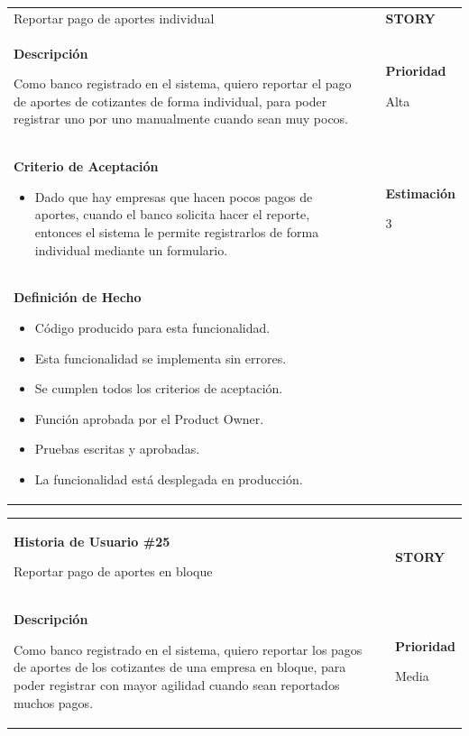 \documentclass[12pt,a4paper]{article}
\begin{document}
\begin{center}
\begin{tabular}{| p{10cm} c p{2.5cm}|}
Reportar pago de aportes individual & & \textbf{{\Large STORY}} \\ 
\textbf{Descripción}

Como banco registrado en el sistema, quiero reportar el pago de aportes
de cotizantes de forma individual, para poder registrar uno por uno
manualmente cuando sean muy pocos. &  & \textbf{Prioridad}

Alta\\

\textbf{Criterio de Aceptación}

\begin{itemize}
\item Dado que hay empresas que hacen pocos pagos de aportes, cuando el banco solicita
hacer el reporte, entonces el sistema le permite registrarlos de forma individual
mediante un formulario.
\end{itemize} & & \textbf{Estimación}

3 \\ 

\textbf{Definición de Hecho}

\begin{itemize}
\item Código producido para esta funcionalidad.
\item Esta funcionalidad se implementa sin errores.
\item Se cumplen todos los criterios de aceptación.
\item Función aprobada por el Product Owner.
\item Pruebas escritas y aprobadas.
\item La funcionalidad está desplegada en producción.
\end{itemize} & & \\
\hline  
\end{tabular}
\vspace{5mm}

\begin{tabular}{| p{10cm} c p{2.5cm}|}
\hline 
\textbf{Historia de Usuario \#25}

Reportar pago de aportes en bloque & & \textbf{{\Large STORY}} \\ 
\textbf{Descripción}

Como banco registrado en el sistema, quiero reportar los pagos de aportes
de los cotizantes de una empresa en bloque, para poder registrar con mayor
agilidad cuando sean reportados muchos pagos. &  & \textbf{Prioridad}

Media\\


\end{tabular}
\end{center}
\end{document}
